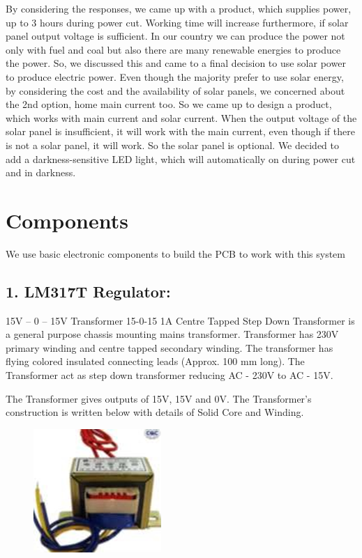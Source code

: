 \documentclass[twocolumn]{article}
\begin{document}
    \noindent By considering the responses, we came up with 
    a product, which supplies power, up to 3 hours 
    during power cut. Working time will increase 
    furthermore, if solar panel output voltage is 
    sufficient. In our country we can produce the 
    power not only with fuel and coal but also there 
    are many renewable energies to produce the 
    power. So, we discussed this and came to a 
    final decision to use solar power to produce 
    electric power. Even though the majority prefer 
    to use solar energy, by considering the cost and 
    the availability of solar panels, we concerned 
    about the 2nd option, home main current too. So 
    we came up to design a product, which works 
    with main current and solar current. When the 
    output voltage of the solar panel is insufficient, 
    it will work with the main current, even though 
    if there is not a solar panel, it will work. So the 
    solar panel is optional. We decided to add a 
    darkness-sensitive LED light, which will 
    automatically on during power cut and in 
    darkness.

\section*{Components}
We use basic electronic components to build the PCB to work with this system

\subsection*{1. LM317T Regulator:}
15V – 0 – 15V Transformer
15-0-15 1A Centre Tapped Step Down 
Transformer is a general purpose chassis 
mounting mains transformer. Transformer has 
230V primary winding and centre tapped 
secondary winding. The transformer has flying 
colored insulated connecting leads (Approx.
100 mm long). The Transformer act as step 
down transformer reducing AC - 230V to AC -
15V.

\noindent The Transformer gives outputs of 15V, 15V and 
0V. The Transformer's construction is written 
below with details of Solid Core and Winding.

\begin{figure}[h]
    \centering
    \includegraphics{1.png}
    \label{fig:enter-label}
\end{figure}
\end{document}
